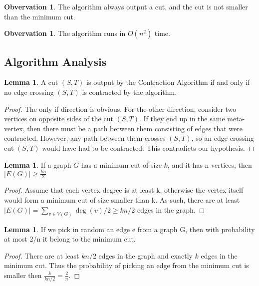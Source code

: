 \documentclass[11pt]{article}
\theoremstyle{plain}
\theoremstyle{definition}
\newtheorem{lem}[thm]{Lemma}
\newtheorem{obser}[thm]{Obvervation}
\theoremstyle{remark}
\begin{document}
	\begin{obser}
	The algorithm always output a cut, and the cut is not smaller than the minimum cut.
	\end{obser}
	
	\begin{obser}
	The algorithm runs in $ O(n^2) $ time.
	\end{obser}


	
	
\subsection{Algorithm Analysis}	

	\begin{lem}
	A cut $ (S,T) $ is output by the Contraction Algorithm if and only if no edge crossing $ (S,T) $ is contracted by the algorithm.
	\end{lem}
	\begin{proof}
	The only if direction is obvious. For the other direction, consider two vertices on opposite sides of the cut $ (S,T) $. If they end up in the same meta-vertex, then there must be a path between them consisting of edges that were contracted. However, any path between them crosses $ (S,T) $, so an edge crossing cut $ (S,T) $ would have had to be contracted. This contradicts our hypothesis.
	\end{proof}
	
	\begin{lem}
	If a graph $ G $ has a minimum cut of size $ k $, and it has n vertices, then $ |E(G)|\geq \frac{kn}{2} $
	\end{lem}
	\begin{proof}
	Assume that each vertex degree is at least k, otherwise the vertex itself would form a minimum cut of size smaller than k. As such, there are at least $ |E(G)|=\sum_{v\in V(G)} \deg(v)/2 \geq kn/2 $ edges in the graph. 
	\end{proof}
	
	\begin{lem}
	If we pick in random an edge e from a graph G, then with probability at most 2/n it belong to the minimum cut.
	\end{lem}
	\begin{proof}
	There are at least $ kn/2 $ edges in the graph and exactly $ k $ edges in the minimum cut. Thus the probability of picking an edge from the minimum cut is smaller then $ \frac{k}{kn/2}=\frac{2}{n} $.
	\end{proof}
	
\end{document}
